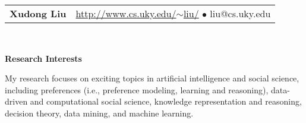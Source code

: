 \singlespacing
\hypersetup{
    colorlinks,%
    citecolor=black,%
    filecolor=black,%
    linkcolor=black,%
    urlcolor=black 
}
\textheight=9.0in
\raggedbottom
\raggedright
\setlength{\tabcolsep}{0in}

\addtolength{\oddsidemargin}{-0.375in}
\addtolength{\evensidemargin}{0.375in}
\addtolength{\textwidth}{0.5in}
\addtolength{\topmargin}{-.375in}
\addtolength{\textheight}{0.75in}

\newcommand{\resitem}[1]{\item #1 \vspace{-2pt}}
\newcommand{\resheading}[1]{{\large \colorbox{mygrey}{\begin{minipage}{\textwidth}{\textbf{#1 \vphantom{p\^{E}}}}\end{minipage}}}}
\newcommand{\ressubheading}[4]{
\begin{tabular*}{6.5in}{l@{\extracolsep{\fill}}r}
		\textbf{#1} & #2 \\
		\textit{#3} & \textit{#4} \\
\end{tabular*}\vspace{-6pt}}

\newcommand{\ressubsubheading}[2]{
\begin{tabular*}{6.5in}{l@{\extracolsep{\fill}}r}
		\textit{#1} & \textit{#2} \\
\end{tabular*}\vspace{-6pt}}
\renewcommand{\baselinestretch}{0.9}

\newcommand{\mywebheader}{
\begin{tabular*}{6.5in}{l@{\extracolsep{\fill}}r}
	\textbf{\LARGE Xudong Liu} & 
		\href{http://www.cs.uky.edu/~liu/}{http://www.cs.uky.edu/$\sim$liu/} $\bullet$ 
		liu@cs.uky.edu\\
	\end{tabular*}
\\
\vspace{0.1in}}

\mywebheader

\resheading{Research Interests}
My research focuses on exciting topics in artificial intelligence and social science, including
preferences (i.e., preference modeling, learning and reasoning), 
data-driven and computational social science, 
knowledge representation and reasoning, 
decision theory, data mining, and machine learning.
\vspace{3pt}


